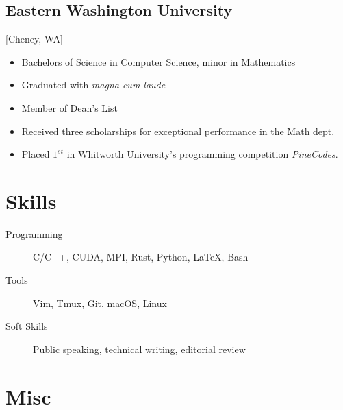 \documentclass{mycv}
\begin{document}
\subsection{Eastern Washington University}[Cheney, WA]
\vspace{-\parskip}%
\begin{itemize}[label={}]
  \item Bachelors of Science in Computer Science, minor in Mathematics 
  \item Graduated with \textit{magna cum laude}
  \item Member of Dean's List
  \item Received three scholarships for exceptional performance in the Math dept.
  \item Placed $1^{st}$ in Whitworth University's programming competition \textit{PineCodes}. 
\end{itemize}

\section{Skills}

\begin{description}
  \item[Programming] C/C++, CUDA, MPI, Rust, Python, \LaTeX, Bash
  \item[Tools] Vim, Tmux, Git, macOS, Linux
  \item[Soft Skills] Public speaking, technical writing, editorial review
\end{description}

\section{Misc}
\end{document}
